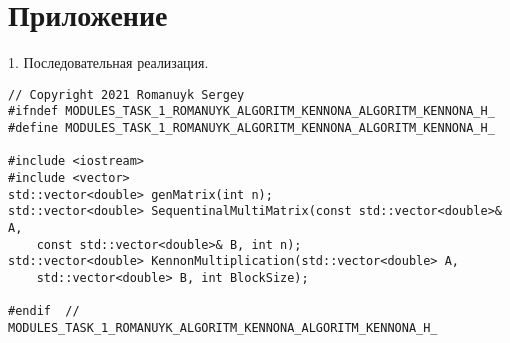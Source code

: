 \documentclass{report}
\begin{document}
\section*{Приложение}
\par 1. Последовательная реализация.
\begin{lstlisting}
// Copyright 2021 Romanuyk Sergey
#ifndef MODULES_TASK_1_ROMANUYK_ALGORITM_KENNONA_ALGORITM_KENNONA_H_
#define MODULES_TASK_1_ROMANUYK_ALGORITM_KENNONA_ALGORITM_KENNONA_H_

#include <iostream>
#include <vector>
std::vector<double> genMatrix(int n);
std::vector<double> SequentinalMultiMatrix(const std::vector<double>& A,
    const std::vector<double>& B, int n);
std::vector<double> KennonMultiplication(std::vector<double> A,
    std::vector<double> B, int BlockSize);

#endif  // MODULES_TASK_1_ROMANUYK_ALGORITM_KENNONA_ALGORITM_KENNONA_H_
\end{lstlisting}
\end{document}
